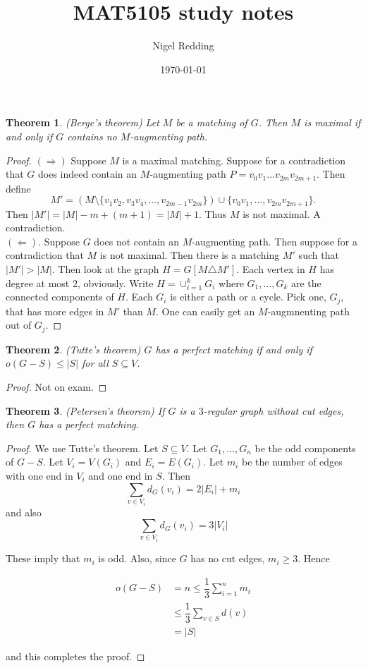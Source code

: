 \documentclass[12pt]{amsart}
\title{MAT5105 study notes}
\author{Nigel Redding}
\date{\today}
\newtheorem{thm}{Theorem}
\theoremstyle{definition}
\begin{document}
\maketitle

\begin{thm} (Berge's theorem)
Let $M$ be a matching of $G$.
Then $M$ is maximal if and only if $G$ contains no $M$-augmenting path.
\end{thm}

\begin{proof}
$(\Rightarrow)$ Suppose $M$ is a maximal matching. Suppose for a contradiction that $G$ does indeed
contain an $M$-augmenting path $P = v_0 v_1 \ldots v_{2m} v_{2m+1}$. Then define
\[
M' = (M \setminus \{v_1 v_2, v_3 v_4, \ldots, v_{2m-1} v_{2m}\})
       \cup \{v_0 v_1, \ldots, v_{2m} v_{2m+1}\}.
\]
Then $|M'| = |M| - m + (m+1) = |M|+1$. Thus $M$ is not maximal. A contradiction.\\

$(\Leftarrow)$. Suppose $G$ does not contain an $M$-augmenting path. Then suppose for a contradiction
that $M$ is not maximal. Then there is a matching $M'$ such that $|M'| > |M|$. Then look at the graph
$H = G[M \triangle M']$. Each vertex in $H$ has degree at most $2$, obviously. Write
$H = \cup_{i=1}^k G_i$ where $G_1,\ldots,G_k$ are the connected components of $H$. Each $G_i$ is either
a path or a cycle. Pick one, $G_j$, that has more edges in $M'$ than $M$. One can easily get an $M$-augmnenting
path out of $G_j$.
\end{proof}

\begin{thm} (Tutte's theorem)
$G$ has a perfect matching if and only if $o(G-S) \leq |S|$ for all $S \subseteq V$.
\end{thm}

\begin{proof}
Not on exam.
\end{proof}

\begin{thm} (Petersen's theorem)
If $G$ is a $3$-regular graph without cut edges, then $G$ has a perfect matching.
\end{thm}

\begin{proof}
We use Tutte's theorem. Let $S \subseteq V$. Let $G_1,\ldots,G_n$ be the odd components
of $G-S$. Let $V_i = V(G_i)$ and $E_i = E(G_i)$. Let $m_i$ be the number of edges with one end in
$V_i$ and one end in $S$. Then \[\sum\limits_{v \in V_i} d_G(v_i) = 2|E_i| + m_i\] and also
\[\sum\limits_{v \in V_i} d_G(v_i) = 3|V_i|\]

These imply that $m_i$ is odd. Also, since $G$ has no cut edges,
$m_i \geq 3$. Hence

\begin{align*}
  o(G-S) &= n \leq \dfrac{1}{3} \sum\limits_{i=1}^n m_i \\
         &\leq \dfrac{1}{3} \sum\limits_{v \in S} d(v) \\
         &= |S|
\end{align*}

and this completes the proof.
\end{proof}
\end{document}
